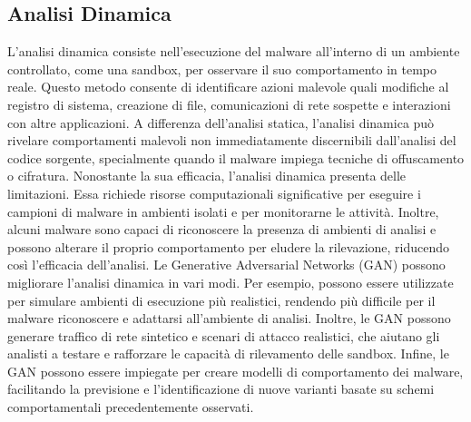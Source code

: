 \subsection{Analisi Dinamica}
L'analisi dinamica consiste nell'esecuzione del malware all'interno di un ambiente controllato, come una sandbox, per osservare il suo comportamento in tempo reale. Questo metodo consente di identificare azioni malevole quali modifiche al registro di sistema, creazione di file, comunicazioni di rete sospette e interazioni con altre applicazioni. A differenza dell'analisi statica, l'analisi dinamica può rivelare comportamenti malevoli non immediatamente discernibili dall'analisi del codice sorgente, specialmente quando il malware impiega tecniche di offuscamento o cifratura.
Nonostante la sua efficacia, l'analisi dinamica presenta delle limitazioni. Essa richiede risorse computazionali significative per eseguire i campioni di malware in ambienti isolati e per monitorarne le attività. Inoltre, alcuni malware sono capaci di riconoscere la presenza di ambienti di analisi e possono alterare il proprio comportamento per eludere la rilevazione, riducendo così l'efficacia dell'analisi.
Le Generative Adversarial Networks (GAN) possono migliorare l'analisi dinamica in vari modi. Per esempio, possono essere utilizzate per simulare ambienti di esecuzione più realistici, rendendo più difficile per il malware riconoscere e adattarsi all'ambiente di analisi. Inoltre, le GAN possono generare traffico di rete sintetico e scenari di attacco realistici, che aiutano gli analisti a testare e rafforzare le capacità di rilevamento delle sandbox. Infine, le GAN possono essere impiegate per creare modelli di comportamento dei malware, facilitando la previsione e l'identificazione di nuove varianti basate su schemi comportamentali precedentemente osservati.


